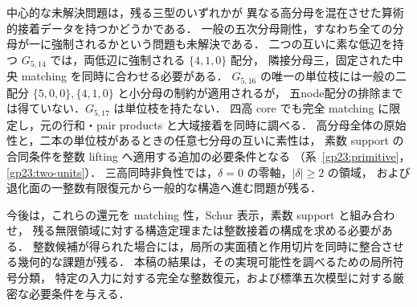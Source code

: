 中心的な未解決問題は，残る三型のいずれかが
異なる高分母を混在させた算術的接着データを持つかどうかである．
一般の五次分母剛性，すなわち全ての分母が一に強制されるかという問題も未解決である．
二つの互いに素な低辺を持つ $G_{5,14}$ では，両低辺に強制される $\{4,1,0\}$ 配分，
隣接分母三，固定された中央 matching を同時に合わせる必要がある．
$G_{5,16}$ の唯一の単位枝には一般の二配分 $\{5,0,0\},\{4,1,0\}$ と小分母の制約が適用されるが，
五node配分の排除までは得ていない．$G_{5,17}$ は単位枝を持たない．
四高 core でも完全 matching に限定し，元の行和・pair products と大域接着を同時に調べる．
高分母全体の原始性と，二本の単位枝があるときの任意七分母の互いに素性は，
素数 support の合同条件を整数 lifting へ適用する追加の必要条件となる
（系~\ref{gp23:primitive}，\ref{gp23:two-units}）．
三高同時非負性では，$\delta=0$ の零軸，$|\delta|\ge2$ の領域，
および退化面の一整数有限復元から一般的な構造へ進む問題が残る．

今後は，これらの還元を matching 性，Schur 表示，素数 support と組み合わせ，
残る無限領域に対する構造定理または整数接着の構成を求める必要がある．
整数候補が得られた場合には，局所の実面積と作用切片を同時に整合させる幾何的な課題が残る．
本稿の結果は，その実現可能性を調べるための局所符号分類，
特定の入力に対する完全な整数復元，および標準五次模型に対する厳密な必要条件を与える．
